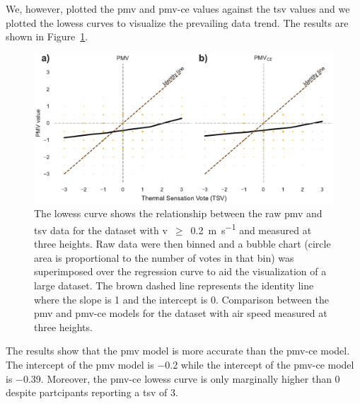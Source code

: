 We, however, plotted the \ac{pmv} and \ac{pmv-ce} values against the \ac{tsv} values and we plotted the \ac{lowess} curves to visualize the prevailing data trend.
The results are shown in Figure~\ref{fig:bubble_models_vs_tsv_three_heights}.
\begin{figure}[htb!]
    \centering
    \includegraphics[width=\textwidth]{figures/bubble_models_vs_tsv_three_heights}
    \caption{The \ac{lowess} curve shows the relationship between the raw \ac{pmv} and \ac{tsv} data for the dataset with \ac{v}~$\geq$~\qty{0.2}{\m\per\s} and measured at three heights.
    Raw data were then binned and a bubble chart (circle area is proportional to the number of votes in that bin) was superimposed over the regression curve to aid the visualization of a large dataset.
    The brown dashed line represents the identity line where the slope is 1 and the intercept is 0.
    Comparison between the \ac{pmv} and \ac{pmv-ce} models for the dataset with air speed measured at three heights.}
    \label{fig:bubble_models_vs_tsv_three_heights}
\end{figure}
The results show that the \ac{pmv} model is more accurate than the \ac{pmv-ce} model.
The intercept of the \ac{pmv} model is \num{-.2} while the intercept of the \ac{pmv-ce} model is \num{-.39}.
Moreover, the \ac{pmv-ce} \ac{lowess} curve is only marginally higher than \num{0} despite partcipants reporting a \ac{tsv} of \num{3}.

